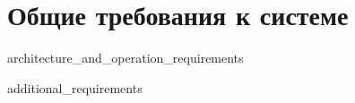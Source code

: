 \section{Общие требования к системе}


{architecture_and_operation_requirements}


{additional_requirements}
